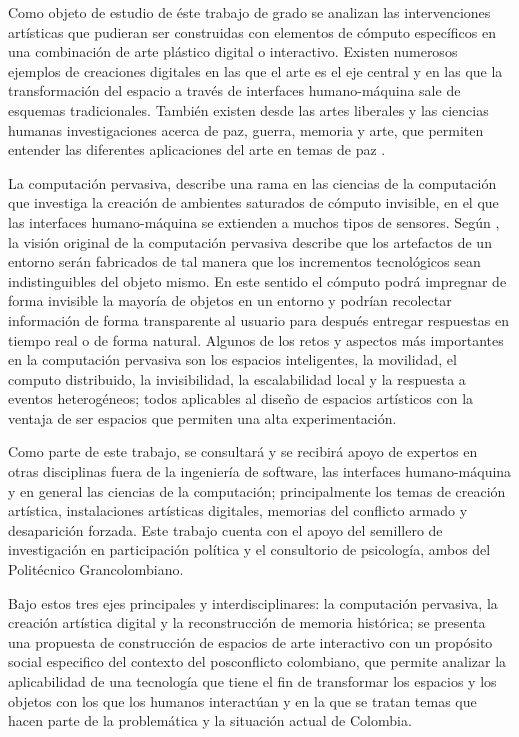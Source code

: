Como objeto de estudio de éste trabajo de grado se analizan las intervenciones artísticas que pudieran ser construidas con elementos de cómputo específicos en una combinación de arte plástico digital o interactivo. Existen numerosos ejemplos
\cite{RN35,RN25,RN34,RN38,RN31,RN29,RN40,RN37}
de creaciones digitales en las que el arte es el eje central y en las que la transformación del espacio a través de interfaces humano-máquina sale de esquemas tradicionales. También existen desde las artes liberales y las ciencias humanas investigaciones acerca de paz, guerra, memoria y arte, que permiten entender las diferentes aplicaciones del arte en temas de paz \cite{Jimenez201672,SotoAguilar201591,EstripeautBourjac2013154}.

La computación pervasiva, describe una rama en las ciencias de la computación que investiga la creación de ambientes saturados de cómputo invisible, en el que las interfaces humano-máquina se extienden a muchos tipos de sensores. Según \cite{RN1}, la visión original de la computación pervasiva describe que los artefactos de un entorno serán fabricados de tal manera que los incrementos tecnológicos sean indistinguibles del objeto mismo. En este sentido el cómputo podrá impregnar de forma invisible la mayoría de objetos en un entorno y podrían recolectar información de forma transparente al usuario para después entregar respuestas en tiempo real o de forma natural.  Algunos de los retos y aspectos más importantes en la computación pervasiva son los espacios inteligentes, la movilidad, el computo distribuido, la invisibilidad, la escalabilidad local y la respuesta a eventos heterogéneos; todos aplicables al diseño de espacios artísticos con la ventaja de ser espacios que permiten una alta experimentación.

Como parte de este trabajo, se consultará y se recibirá apoyo de expertos en otras disciplinas fuera de la ingeniería de software, las interfaces humano-máquina y en general las ciencias de la computación; principalmente los temas de creación artística, instalaciones artísticas digitales, memorias del conflicto armado y desaparición forzada. Este trabajo cuenta con el apoyo del semillero de investigación en participación política y el consultorio de psicología, ambos del Politécnico Grancolombiano.

Bajo estos tres ejes principales y interdisciplinares: la computación pervasiva, la creación artística digital y la reconstrucción de memoria histórica; se presenta una propuesta de construcción de espacios de arte interactivo con un propósito social especifico del contexto del posconflicto colombiano, que permite analizar la aplicabilidad de una tecnología que tiene el fin de transformar los espacios y los objetos con los que los humanos interactúan y en la que se tratan temas que hacen parte de la problemática y la situación actual de Colombia.


